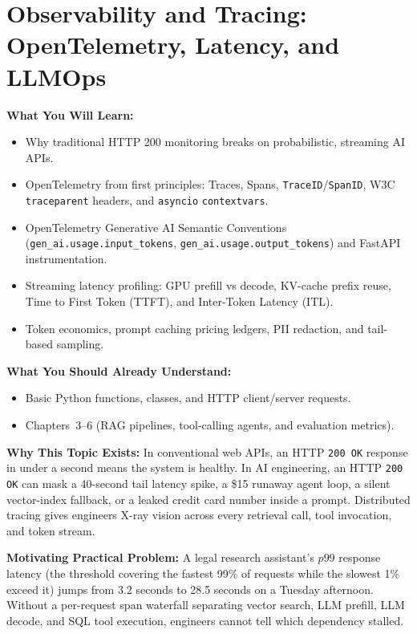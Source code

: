 \chapter{Observability and Tracing: OpenTelemetry, Latency, and LLMOps}
\label{chap:observability}

\begin{chaptergoalsbox}
\textbf{What You Will Learn:}
\begin{itemize}[leftmargin=15pt]
  \item Why traditional HTTP 200 monitoring breaks on probabilistic, streaming AI APIs.
  \item OpenTelemetry from first principles: Traces, Spans, \texttt{TraceID}/\texttt{SpanID}, W3C \texttt{traceparent} headers, and \texttt{asyncio} \texttt{contextvars}.
  \item OpenTelemetry Generative AI Semantic Conventions (\texttt{gen\_ai.usage.input\_tokens}, \texttt{gen\_ai.usage.output\_tokens}) and FastAPI instrumentation.
  \item Streaming latency profiling: GPU prefill vs decode, KV-cache prefix reuse, Time to First Token (TTFT), and Inter-Token Latency (ITL).
  \item Token economics, prompt caching pricing ledgers, PII redaction, and tail-based sampling.
\end{itemize}

\textbf{What You Should Already Understand:}
\begin{itemize}[leftmargin=15pt]
  \item Basic Python functions, classes, and HTTP client/server requests.
  \item Chapters~3--6 (RAG pipelines, tool-calling agents, and evaluation metrics).
\end{itemize}

\textbf{Why This Topic Exists:}
In conventional web APIs, an HTTP \texttt{200 OK} response in under a second means the system is healthy. In AI engineering, an HTTP \texttt{200 OK} can mask a 40-second tail latency spike, a \$15 runaway agent loop, a silent vector-index fallback, or a leaked credit card number inside a prompt. Distributed tracing gives engineers X-ray vision across every retrieval call, tool invocation, and token stream.

\textbf{Motivating Practical Problem:}
A legal research assistant's $p99$ response latency (the threshold covering the fastest 99\% of requests while the slowest 1\% exceed it) jumps from 3.2 seconds to 28.5 seconds on a Tuesday afternoon. Without a per-request span waterfall separating vector search, LLM prefill, LLM decode, and SQL tool execution, engineers cannot tell which dependency stalled.
\end{chaptergoalsbox}

